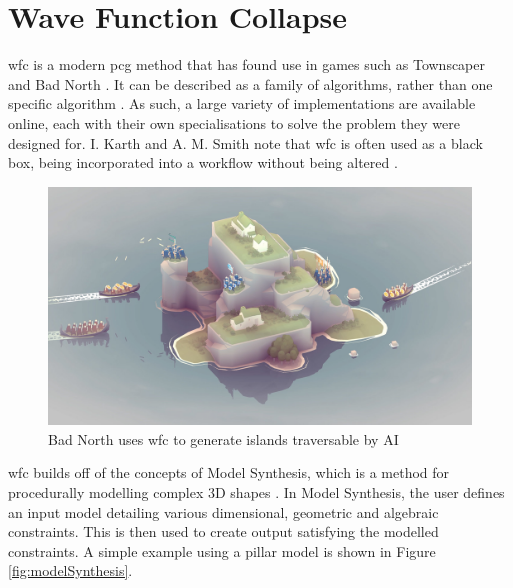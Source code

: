 
\section{Wave Function Collapse}
\acrfull{wfc} \cite{Gumin_Wave_Function_Collapse_2016} is a modern \acrshort{pcg} method that has found use in games such as Townscaper \cite{townscaper} and Bad North \cite{badnorth}. It can be described as a family of algorithms, rather than one specific algorithm \cite{WFC_ConstraintSolving_and_ML}. As such, a large variety of implementations are available online, each with their own specialisations to solve the problem they were designed for. I. Karth and A. M. Smith note that \acrlong{wfc} is often used as a black box, being incorporated into a workflow without being altered \cite{WFC_In_The_Wild}.

\begin{figure}[H]
    \centering
    \includegraphics[width=\textwidth, height=0.3\textheight, keepaspectratio]{Images/BadNorth.jpg}
    \caption{Bad North uses \acrshort{wfc} to generate islands traversable by AI \cite{badnorth}}
    \label{fig:badNorth}
\end{figure}

\acrlong{wfc} builds off of the concepts of Model Synthesis, which is a method for procedurally modelling complex 3D shapes \cite{model_synthesis, model_synthesis_diss}. In Model Synthesis, the user defines an input model detailing various dimensional, geometric and algebraic constraints. This is then used to create output satisfying the modelled constraints. A simple example using a pillar model is shown in Figure \ref{fig:modelSynthesis}.

